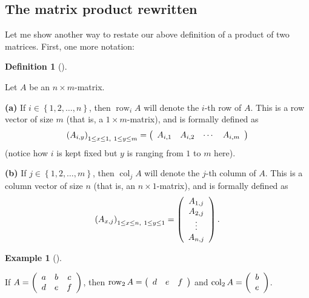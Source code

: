 \documentclass[numbers=enddot,12pt,final,onecolumn,notitlepage]{scrartcl}%
\theoremstyle{definition}
\newtheorem{defi}[theo]{Definition}
\newenvironment{definition}[1][]
{\begin{defi}[#1]\begin{leftbar}}
{\end{leftbar}\end{defi}}
\newtheorem{exam}[theo]{Example}
\newenvironment{example}[1][]
{\begin{exam}[#1]\begin{leftbar}}
{\end{leftbar}\end{exam}}
\begin{document}
\subsection{The matrix product rewritten}

Let me show another way to restate our above definition of a product of two
matrices. First, one more notation:

\begin{definition}
Let $A$ be an $n\times m$-matrix.

\textbf{(a)} If $i\in\left\{  1,2,\ldots,n\right\}  $, then
$\operatorname*{row}\nolimits_{i}A$ will denote the $i$-th row of $A$. This is
a row vector of size $m$ (that is, a $1\times m$-matrix), and is formally
defined as
\[
\left(  A_{i,y}\right)  _{1\leq x\leq1,\ 1\leq y\leq m}=\left(
\begin{array}
[c]{cccc}%
A_{i,1} & A_{i,2} & \cdots & A_{i,m}%
\end{array}
\right)
\]
(notice how $i$ is kept fixed but $y$ is ranging from $1$ to $m$ here).

\textbf{(b)} If $j\in\left\{  1,2,\ldots,m\right\}  $, then
$\operatorname*{col}\nolimits_{j}A$ will denote the $j$-th column of $A$. This
is a column vector of size $n$ (that is, an $n\times1$-matrix), and is
formally defined as
\[
\left(  A_{x,j}\right)  _{1\leq x\leq n,\ 1\leq y\leq1}=\left(
\begin{array}
[c]{c}%
A_{1,j}\\
A_{2,j}\\
\vdots\\
A_{n,j}%
\end{array}
\right)  .
\]

\end{definition}

\begin{example}
If $A=\left(
\begin{array}
[c]{ccc}%
a & b & c\\
d & e & f
\end{array}
\right)  $, then $\operatorname*{row}\nolimits_{2}A=\left(
\begin{array}
[c]{ccc}%
d & e & f
\end{array}
\right)  $ and $\operatorname*{col}\nolimits_{2}A=\left(
\begin{array}
[c]{c}%
b\\
e
\end{array}
\right)  $.
\end{example}
\end{document}
